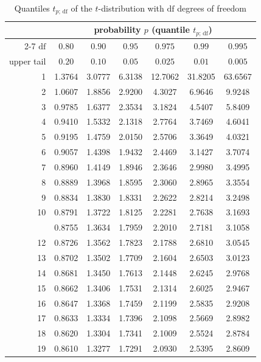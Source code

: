 \documentclass[a4paper]{article}
\theoremstyle{break}
\begin{document}
\begin{table}[H]
\centering
\caption{\label{tab:t}Quantiles $t_{p;\,\mathrm{df}}$ of the $t$-distribution with $\mathrm{df}$ degrees of freedom}
\begin{footnotesize}
\renewcommand{\arraystretch}{1.02}
\begin{tabular}{r*{6}{c}}
\toprule
 & \multicolumn{6}{c}{probability $p$ (quantile $t_{p;\,\mathrm{df}}$)}\\
\cmidrule(l){2-7}
$\mathrm{df}$ & $0.80$ & $0.90$ & $0.95$ & $0.975$ & $0.99$ & $0.995$\\
\multicolumn{1}{r}{\scriptsize upper tail} & $0.20$ & $0.10$ & $0.05$ & $0.025$ & $0.01$ & $0.005$\\
\midrule
1 & 1.3764 & 3.0777 & 6.3138 & 12.7062 & 31.8205 & 63.6567\\
2 & 1.0607 & 1.8856 & 2.9200 & 4.3027 & 6.9646 & 9.9248\\
3 & 0.9785 & 1.6377 & 2.3534 & 3.1824 & 4.5407 & 5.8409\\
4 & 0.9410 & 1.5332 & 2.1318 & 2.7764 & 3.7469 & 4.6041\\
5 & 0.9195 & 1.4759 & 2.0150 & 2.5706 & 3.3649 & 4.0321\\
6 & 0.9057 & 1.4398 & 1.9432 & 2.4469 & 3.1427 & 3.7074\\
7 & 0.8960 & 1.4149 & 1.8946 & 2.3646 & 2.9980 & 3.4995\\
8 & 0.8889 & 1.3968 & 1.8595 & 2.3060 & 2.8965 & 3.3554\\
9 & 0.8834 & 1.3830 & 1.8331 & 2.2622 & 2.8214 & 3.2498\\
10 & 0.8791 & 1.3722 & 1.8125 & 2.2281 & 2.7638 & 3.1693\\
\addlinespace
11 & 0.8755 & 1.3634 & 1.7959 & 2.2010 & 2.7181 & 3.1058\\
12 & 0.8726 & 1.3562 & 1.7823 & 2.1788 & 2.6810 & 3.0545\\
13 & 0.8702 & 1.3502 & 1.7709 & 2.1604 & 2.6503 & 3.0123\\
14 & 0.8681 & 1.3450 & 1.7613 & 2.1448 & 2.6245 & 2.9768\\
15 & 0.8662 & 1.3406 & 1.7531 & 2.1314 & 2.6025 & 2.9467\\
16 & 0.8647 & 1.3368 & 1.7459 & 2.1199 & 2.5835 & 2.9208\\
17 & 0.8633 & 1.3334 & 1.7396 & 2.1098 & 2.5669 & 2.8982\\
18 & 0.8620 & 1.3304 & 1.7341 & 2.1009 & 2.5524 & 2.8784\\
19 & 0.8610 & 1.3277 & 1.7291 & 2.0930 & 2.5395 & 2.8609\\

\end{tabular}
\end{footnotesize}
\end{table}
\end{document}
